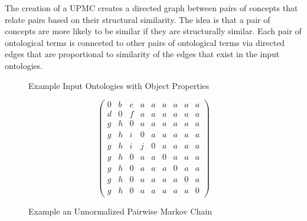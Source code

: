 \documentclass[letterpaper,twocolumn,12pt]{article}
\begin{document}
The creation of a UPMC creates a directed graph between pairs of concepts that relate 
pairs based on their structural similarity.
The idea is that a pair of concepts are more likely to be similar if they are structurally similar.
Each pair of ontological terms is connceted to other pairs of ontological terms via directed 
edges that are proportional to similarity of the edges that exist in the input ontologies. 

\begin{figure*}
\centering
\SetVertexNormal[
	Shape = circle,
    LineWidth = 1pt
]
\SetUpEdge[
	lw = 1pt,
    color = orange,
    labelcolor = white
]
\caption{Example Input Ontologies with Object Properties}
\label{fig:input}
\end{figure*}

\begin{figure*}
\begin{equation*}
\left( \begin{array}{ccccccccc}
0 & b & c & a & a & a & a & a & a \\
d & 0 & f & a & a & a & a & a & a \\
g & h & 0 & a & a & a & a & a & a \\
g & h & i & 0 & a & a & a & a & a \\
g & h & i & j & 0 & a & a & a & a \\
g & h & 0 & a & a & 0 & a & a & a \\
g & h & 0 & a & a & a & 0 & a & a \\
g & h & 0 & a & a & a & a & 0 & a \\
g & h & 0 & a & a & a & a & a & 0 \end{array} \right)
\end{equation*}
\caption{Example an Unnormalized Pairwise Markov Chain}
\label{fig:upmc}
\end{figure*}
\end{document}
